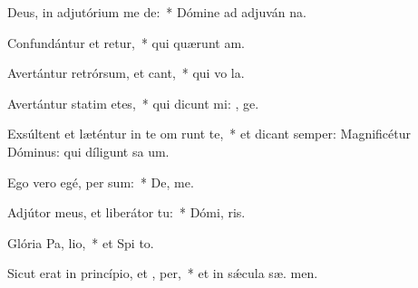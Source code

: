 \item Deus, in adjutórium me de:~* Dómine ad adjuván  na.
\item Confundántur et retur,~* qui quærunt  am.
\item Avertántur retrórsum, et cant,~* qui vo  la.
\item Avertántur statim etes,~* qui dicunt mi: , ge.
\item Exsúltent et læténtur in te om  runt te,~* et dicant semper: Magnificétur Dóminus: qui díligunt sa um.
\item Ego vero egé,  per sum:~* De,  me.
\item Adjútor meus, et liberátor   tu:~* Dómi,  ris.
\item Glória Pa,  lio,~* et Spi to.
\item Sicut erat in princípio, et ,  per,~* et in sǽcula sæ. men.
